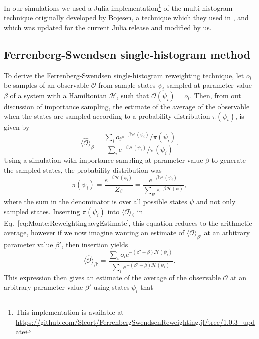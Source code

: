 In our simulations we used a Julia implementation\footnote{This implementation is available at
\url{https://github.com/Sleort/FerrenbergSwendsenReweighting.jl/tree/1.0.3_update}}
 of the multi-histogram technique originally developed by Bojesen, a technique which they used in \cite{Bojesen13M},
and which was updated for the current Julia release and modified by us.

\subsection{Ferrenberg-Swendsen single-histogram method}

To derive the Ferrenberg-Swendsen single-histogram reweighting technique, let $o_i$ be samples of an observable $\mathcal{O}$ from sample states $\psi_i$ sampled
at parameter value $\beta$ of a system
with a Hamiltonian $\mathcal{H}$, such that $\mathcal{O}(\psi_i) = o_i$.
Then, from out discussion of importance sampling, the estimate of the average of the observable when the states are sampled
according to a probability distribution $\pi(\psi_i)$, is given by
\begin{equation}
    \label{eq:Monte:Reweighting:avgEstimate}
    \langle \hat{\mathcal{O}}\rangle_\beta = \frac{\sum_io_ie^{-\beta\mathcal{H}(\psi_i)}/\pi(\psi_i)}{\sum_ie^{-\beta\mathcal{H}(\psi_i)}/\pi(\psi_i)}.
\end{equation}
Using a simulation with importance sampling at parameter-value $\beta$ to generate the sampled states, the probability distribution was
\begin{equation}
    \label{eq:Monte:Reweighting:probDist}
    \pi(\psi_i) = \frac{e^{-\beta\mathcal{H}(\psi_i)}}{Z_\beta} = \frac{e^{-\beta\mathcal{H}(\psi_i)}}{\sum_\psi e^{-\beta\mathcal{H}(\psi)}},
\end{equation}
where the sum in the denominator is over all possible states $\psi$ and not only sampled states. Inserting $\pi(\psi_i)$ into $\langle\mathcal{O}\rangle_\beta$
in Eq.~\eqref{eq:Monte:Reweighting:avgEstimate}, this equation reduces to the arithmetic average, however if we now imagine wanting an estimate of
$\langle\mathcal{O}\rangle_{\beta'}$ at an arbitrary parameter value $\beta'$, then insertion yields
\begin{equation}
    \label{eq:Monte:Reweighting:FS}
    \langle \hat{\mathcal{O}}\rangle_{\beta'} = \frac{\sum_io_ie^{-(\beta'-\beta)\mathcal{H}(\psi_i)}}{\sum_ie^{-(\beta'-\beta)\mathcal{H}(\psi_i)}}.
\end{equation}
This expression then gives an estimate of the average of the observable $\mathcal{O}$ at an arbitrary parameter value $\beta'$ using states $\psi_i$ that
